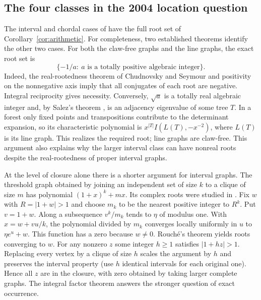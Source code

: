 \documentclass[11pt,a4paper]{article}
\begin{document}
\subsection{The four classes in the 2004 location question}
The interval and chordal cases of \cite[Section~4]{brown2004} have the full root set of Corollary~\ref{cor:arithmetic}. For completeness, two established theorems identify the other two cases. For both the claw-free graphs and the line graphs, the exact root set is
\[
 \{-1/a:\ a\text{ is a totally positive algebraic integer}\}.
\]
Indeed, the real-rootedness theorem of Chudnovsky and Seymour \cite{cs} and positivity on the nonnegative axis imply that all conjugates of each root are negative. Integral reciprocity gives necessity. Conversely, $\sqrt a$ is a totally real algebraic integer and, by Salez's theorem \cite{salez}, is an adjacency eigenvalue of some tree $T$. In a forest only fixed points and transpositions contribute to the determinant expansion, so its characteristic polynomial is $x^{|T|}I(L(T),-x^{-2})$, where $L(T)$ is its line graph. This realizes the required root; line graphs are claw-free. This argument also explains why the larger interval class can have nonreal roots despite the real-rootedness of proper interval graphs.

At the level of closure alone there is a shorter argument for interval graphs. The threshold graph obtained by joining an independent set of size $k$ to a clique of size $m$ has polynomial $(1+x)^k+mx$. Its complex roots were studied in \cite{stability,browncameron}. Fix $w$ with $R=|1+w|>1$ and choose $m_k$ to be the nearest positive integer to $R^k$. Put $v=1+w$. Along a subsequence $v^k/m_k$ tends to $\eta$ of modulus one. With $x=w+v u/k$, the polynomial divided by $m_k$ converges locally uniformly in $u$ to $\eta e^u+w$. This function has a zero because $w\ne0$. Rouch\'e's theorem yields roots converging to $w$. For any nonzero $z$ some integer $h\ge1$ satisfies $|1+hz|>1$. Replacing every vertex by a clique of size $h$ scales the argument by $h$ and preserves the interval property (use $h$ identical intervals for each original one). Hence all $z$ are in the closure, with zero obtained by taking larger complete graphs. The integral factor theorem answers the stronger question of exact occurrence.
\end{document}
